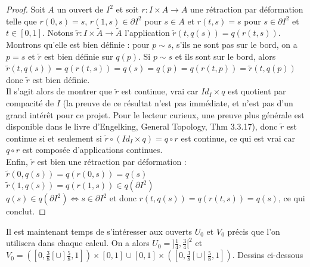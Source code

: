 \begin{proof}
    Soit $A$ un ouvert de $I^2$ et soit $r:I\times A\rightarrow A$ une rétraction par déformation telle que $r(0,s)=s$, $r(1,s)\in\partial I^2$ pour $s\in A$ et $r(t,s)=s$ pour $s\in\partial I^2$ et $t\in[0,1]$.
    Notons $\tilde{r}:I\times\tilde{A}\rightarrow\tilde{A}$ l'application $\tilde{r}(t,q(s))=q(r(t,s))$. Montrons qu'elle est bien définie : pour $p\sim s$, s'ils ne sont pas sur le bord, on a $p=s$ et $\tilde{r}$ est bien définie sur $q(p)$. Si $p\sim s$ et ils sont sur le bord, alors $\tilde{r}(t,q(s))=q(r(t,s))=q(s)=q(p)=q(r(t,p))=\tilde{r}(t,q(p))$ donc $\tilde{r}$ est bien définie.\medskip\\
    Il s'agit alors de montrer que $\tilde{r}$ est continue, vrai car $Id_{I}\times q$ est quotient par compacité de $I$ (la preuve de ce résultat n'est pas immédiate, et n'est pas d'un grand intérêt pour ce projet. Pour le lecteur curieux, une preuve plus générale est disponible dans le livre d'Engelking, General Topology, Thm 3.3.17), donc $\tilde{r}$ est continue si et seulement si $\tilde{r}\circ(Id_{I}\times q)=q\circ r$ est continue, ce qui est vrai car $q\circ r$ est composée d'applications continues.\medskip\\
    Enfin, $\tilde{r}$ est bien une rétraction par déformation :\\ 
    $\tilde{r}(0,q(s))=q(r(0,s))=q(s)$\\
    $\tilde{r}(1,q(s))=q(r(1,s))\in q(\partial I^2)$\\
    $q(s)\in q(\partial I^2)\iff s\in\partial I^2$ et donc $r(t,q(s))=q(r(t,s))=q(s)$, ce qui conclut.
\end{proof}
\newpage
Il est maintenant temps de s'intéresser aux ouverts $U_0$ et $V_0$ précis que l'on utilisera dans chaque calcul. On a alors $U_0=]\frac{1}{4},\frac{3}{4}[^2$ et $V_0=\left([0,\frac{3}{8}[\cup]\frac{5}{8},1]\right)\times[0,1]\cup[0,1]\times\left([0,\frac{3}{8}[\cup]\frac{5}{8},1]\right)$. Dessins ci-dessous\medskip\\
